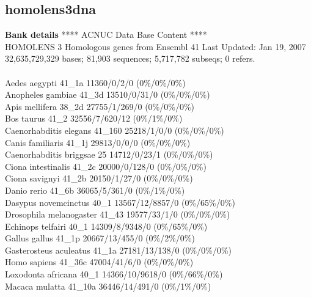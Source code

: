 \documentclass{article}
\begin{document}
\begin{Schunk}
\section{ homolens3dna }
\textbf{Bank details}
            ****     ACNUC Data Base Content      ****  \\
       HOMOLENS 3 Homologous genes from Ensembl 41 Last Updated: Jan 19, 2007\\
32,635,729,329 bases; 81,903 sequences; 5,717,782 subseqs; 0 refers.\\
\\
Aedes aegypti                           41\_1a 11360/0/2/0 (0\%/0\%/0\%)\\
Anopheles gambiae                       41\_3d 13510/0/31/0 (0\%/0\%/0\%)\\
Apis mellifera                          38\_2d 27755/1/269/0 (0\%/0\%/0\%)\\
Bos taurus                              41\_2 32556/7/620/12 (0\%/1\%/0\%)\\
Caenorhabditis elegans                  41\_160 25218/1/0/0 (0\%/0\%/0\%)\\
Canis familiaris                        41\_1j 29813/0/0/0 (0\%/0\%/0\%)\\
Caenorhabditis briggsae                 25 14712/0/23/1 (0\%/0\%/0\%)\\
Ciona intestinalis                      41\_2c 20000/0/128/0 (0\%/0\%/0\%)\\
Ciona savignyi                          41\_2b 20150/1/27/0 (0\%/0\%/0\%)\\
Danio rerio                             41\_6b 36065/5/361/0 (0\%/1\%/0\%)\\
Dasypus novemcinctus                    40\_1 13567/12/8857/0 (0\%/65\%/0\%)\\
Drosophila melanogaster                 41\_43 19577/33/1/0 (0\%/0\%/0\%)\\
Echinops telfairi                       40\_1 14309/8/9348/0 (0\%/65\%/0\%)\\
Gallus gallus                           41\_1p 20667/13/455/0 (0\%/2\%/0\%)\\
Gasterosteus aculeatus                  41\_1a 27181/13/138/0 (0\%/0\%/0\%)\\
Homo sapiens                            41\_36c 47004/41/6/0 (0\%/0\%/0\%)\\
Loxodonta africana                      40\_1 14366/10/9618/0 (0\%/66\%/0\%)\\
Macaca mulatta                          41\_10a 36446/14/491/0 (0\%/1\%/0\%)\\

\end{Schunk}
\end{document}
